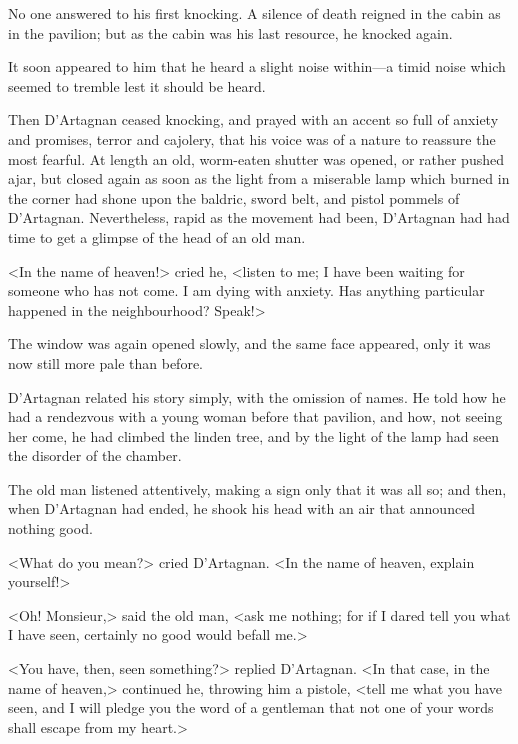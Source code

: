 No one answered to his first knocking. A silence of death reigned in the cabin as in the pavilion; but as the cabin was his last resource, he knocked again. 

It soon appeared to him that he heard a slight noise within—a timid noise which seemed to tremble lest it should be heard. 

Then D'Artagnan ceased knocking, and prayed with an accent so full of anxiety and promises, terror and cajolery, that his voice was of a nature to reassure the most fearful. At length an old, worm-eaten shutter was opened, or rather pushed ajar, but closed again as soon as the light from a miserable lamp which burned in the corner had shone upon the baldric, sword belt, and pistol pommels of D'Artagnan. Nevertheless, rapid as the movement had been, D'Artagnan had had time to get a glimpse of the head of an old man. 

<In the name of heaven!> cried he, <listen to me; I have been waiting for someone who has not come. I am dying with anxiety. Has anything particular happened in the neighbourhood? Speak!> 

The window was again opened slowly, and the same face appeared, only it was now still more pale than before. 

D'Artagnan related his story simply, with the omission of names. He told how he had a rendezvous with a young woman before that pavilion, and how, not seeing her come, he had climbed the linden tree, and by the light of the lamp had seen the disorder of the chamber. 

The old man listened attentively, making a sign only that it was all so; and then, when D'Artagnan had ended, he shook his head with an air that announced nothing good. 

<What do you mean?> cried D'Artagnan. <In the name of heaven, explain yourself!> 

<Oh! Monsieur,> said the old man, <ask me nothing; for if I dared tell you what I have seen, certainly no good would befall me.> 

<You have, then, seen something?> replied D'Artagnan. <In that case, in the name of heaven,> continued he, throwing him a pistole, <tell me what you have seen, and I will pledge you the word of a gentleman that not one of your words shall escape from my heart.> 

